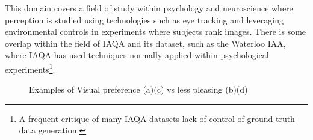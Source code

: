 This domain covers a field of study within psychology and neuroscience where perception is studied using technologies such as eye tracking\cite{Younes2016} and leveraging environmental controls in experiments where subjects rank images. There is some overlap within the field of IAQA and its dataset, such as the Waterloo IAA\cite{Liu2017a}, where IAQA has used techniques normally applied within psychological experiments\footnote{A frequent critique of many IAQA datasets lack of control of ground truth data generation.}. 

\par


\begin{figure}[htp!]
\centering
{}
\caption{Examples of Visual preference (a)(c) vs less pleasing (b)(d) \cite{Bar2006}}
\label{fig:curve}
\end{figure}

